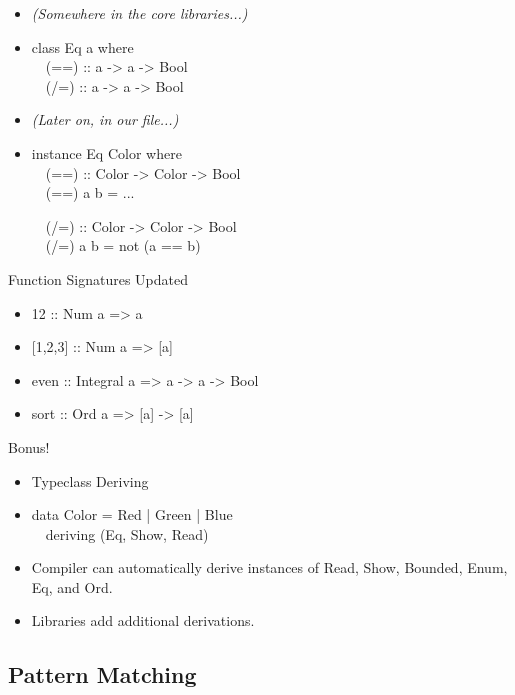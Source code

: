 \documentclass{beamer}                  %
\newcommand{\srule}{
	\rule{\textwidth}{1pt}\\
}
\newlength{\subsecwidth}
\newenvironment{slide}{
	\begin{frame} %
	\settowidth{\subsecwidth}{\insertsubsection} %
	\ifthenelse{\dimtest{\subsecwidth}{<}{1pt}}{ %
		\frametitle{\insertsection\\             %
		\vspace{-1ex}                            %
		\color{fore}\srule                       %
		\par                                     %
		\vspace{-3ex}                            %
		}
	}{                                           %
		\frametitle{\insertsection\ -- \insertsubsection\\ %
		\vspace{-1ex}                            %
		\color{fore}\srule                       %
		\par                                     %
		\vspace{-3ex}                            %
		}
	}
	\Large                                       %
}{
	\end{frame}
}
\begin{document}
\begin{slide}
  \begin{itemize}
  \item \textit{(Somewhere in the core libraries...)}
    \item
      class Eq a where\\
      ~~(==) :: a -> a -> Bool\\
      ~~(/=) :: a -> a -> Bool
    \item \textit{(Later on, in our file...)}
    \item
      instance Eq Color where\\
      ~~(==) :: Color -> Color -> Bool\\
      ~~(==) a b = ...

      ~~(/=) :: Color -> Color -> Bool\\
      ~~(/=) a b = not (a == b)
  \end{itemize}
\end{slide}

\begin{slide}
  Function Signatures Updated
  \begin{itemize}
    \item 12 :: Num a => a
    \item{} [1,2,3] :: Num a => [a]
    \item even :: Integral a => a -> a -> Bool
    \item sort :: Ord a => [a] -> [a]
  \end{itemize}
\end{slide}

\begin{slide}
  Bonus!
  \begin{itemize}
    \item Typeclass Deriving
    \item
      data Color = Red | Green | Blue\\
      ~~deriving (Eq, Show, Read)
    \item Compiler can automatically derive instances of Read, Show,
      Bounded, Enum, Eq, and Ord.
    \item Libraries add additional derivations.
  \end{itemize}
\end{slide}

\subsection{Pattern Matching}
\end{document}
